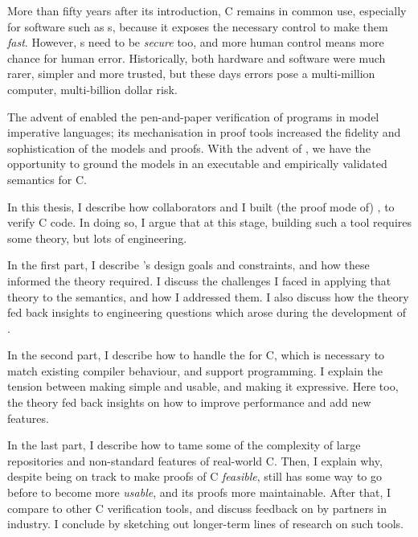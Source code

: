 
More than fifty years after its introduction, C remains in common use,
especially for  software such as  s,
because it exposes the necessary control to make them \emph{fast}. However,
s need to be \emph{secure} too, and more human control means more
chance for human error. Historically, both hardware and software were much
rarer, simpler and more trusted, but these days errors pose a multi-million
computer, multi-billion dollar risk.

The advent of  enabled the pen-and-paper verification of
 programs in model imperative languages; its mechanisation in proof
tools increased the fidelity and sophistication of the models and proofs.
With the advent of ,
we have the opportunity to ground the models in an executable and empirically
validated semantics for C.

In this thesis, I describe how collaborators and I built (the proof mode of)
, to verify  C code. In doing so, I argue that at this stage,
building such a tool requires some theory, but lots of engineering.

In the first part, I describe 's design goals and constraints, and how
these informed the theory required. I discuss the challenges I faced in
applying that theory to the  semantics, and how I addressed them.
I also discuss how the theory fed back insights to engineering questions which
arose during the development of .

In the second part, I describe how to handle the  for
C, which is necessary to match existing compiler behaviour, and support
 programming. I explain the tension between making  simple and
usable, and making it expressive. Here too, the theory fed back insights on how
to improve performance and add new features.

In the last part, I describe how to tame some of the complexity of large
repositories and non-standard features of real-world C. Then, I explain
why, despite being on track to make proofs of  C \emph{feasible},
 still has some way to go before to become more \emph{usable}, and its
proofs more maintainable. After that, I compare  to other C
verification tools, and discuss feedback on  by partners in industry. I
conclude by sketching out longer-term lines of research on such tools.

